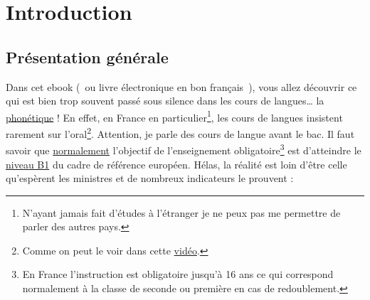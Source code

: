 \chapter{Introduction}\label{chap:intro}
\newpage
\minitoc
\newpage

\section{Présentation générale}\label{sec:pres}
Dans cet ebook (~ou livre électronique en bon français~), vous allez
découvrir ce qui est bien trop souvent passé sous silence dans les
cours de langues\ldots{} la \underline{phonétique} ! En effet, en France en
particulier\footnote{N'ayant jamais fait d'études à l'étranger je ne
  peux pas me permettre de parler des autres pays.}, les cours de
langues insistent rarement sur l'oral\footnote{Comme on peut le voir dans cette \href{http://doyouspeakenglish.fr/les-francais-savent-ils-parler-anglais/}{vidéo}.}. Attention, je parle des cours
de langue avant le bac. Il faut savoir que \underline{normalement}
l'objectif de l'enseignement obligatoire\footnote{En France
  l'instruction est obligatoire jusqu'à 16 ans ce qui correspond
  normalement à la classe de seconde ou première en cas de
  redoublement.} est d'atteindre le
\href{http://doyouspeakenglish.fr/quel-niveau-danglais-avez-vous/}{niveau
  B1} du cadre de référence européen. Hélas, la réalité est
loin d'être celle qu'espèrent les ministres et de nombreux indicateurs le prouvent :
